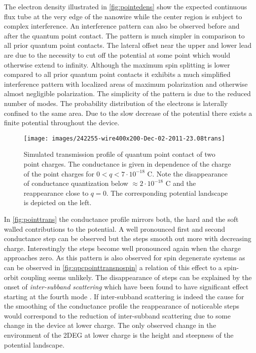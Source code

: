 The electron density illustrated in \cref{fig:pointedens} show the expected continuous flux tube at the very edge of the nanowire while the center region is subject to complex interference. An interference pattern can also be observed before and after the quantum point contact. The pattern is much simpler in comparison to all prior quantum point contacts. The lateral offset near the upper and lower lead are due to the necessity to cut off the potential at some point which would otherwise extend to infinity.
Although the maximum spin splitting is lower compared to all prior quantum point contacts it exhibits a much simplified interference pattern with localized areas of maximum polarization and otherwise almost negligible polarization. The simplicity of the pattern is due to the reduced number of modes. The probability distribution of the electrons is laterally confined to the same area. Due to the slow decrease of the potential there exists a finite potential throughout the device.\par
\begin{figure}[h]
\centering
\texttt{[image: images/242255-wire400x200-Dec-02-2011-23.08trans]}
\caption{Simulated transmission profile of quantum point contact of two point charges. The conductance is given in dependence of the charge of the point charges for $0 < q <7\cdot 10^{-18}$ C. Note the disappearance of conductance quantization below $\approx 2\cdot10^{-18}$ C and the reappearance close to $q=0$. The corresponding potential landscape is depicted on the left.}\label{fig:qpcpointtransspin}
\end{figure}
In \cref{fig:pointtrans} the conductance profile mirrors both, the hard and the soft walled contributions to the potential. A well pronounced first and second conductance step can be observed but the steps smooth out more with decreasing charge. Interestingly the steps become well pronounced again when the charge approaches zero. As this pattern is also observed for spin degenerate systems as can be observed in \cref{fig:qpcpointtransnospin} a relation of this effect to a spin-orbit coupling seems unlikely. 
The disappearance of steps can be explained by the onset of \emph{inter-subband scattering} which have been found to have significant effect starting at the fourth mode \cite{Lehmann2011}. If inter-subband scattering is indeed the cause for the smoothing of the conductance profile the reappearance of noticeable steps would correspond to the reduction of inter-subband scattering due to some change in the device at lower charge. The only observed change in the environment of the 2DEG at lower charge is the height and steepness of the potential landscape.
